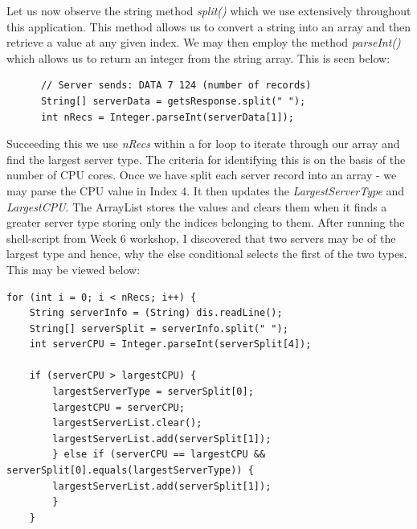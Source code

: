 \documentclass{article}
\begin{document}
Let us now observe the string method \emph{split()} which we use extensively throughout this application. This method allows us to convert a string into an array and then retrieve a value at any given index. We may then employ the method \emph{parseInt()} which allows us to return an integer from the string array. This is seen below:

\begin{lstlisting}
      // Server sends: DATA 7 124 (number of records)
      String[] serverData = getsResponse.split(" ");
      int nRecs = Integer.parseInt(serverData[1]);
\end{lstlisting}

Succeeding this we use \emph{nRecs} within a for loop to iterate through our array and find the largest server type. The criteria for identifying this is on the basis of the number of CPU cores. Once we have split each server record into an array - we may parse the CPU value in Index 4. It then updates the \emph{LargestServerType} and \emph{LargestCPU}. The ArrayList stores the values and clears them when it finds a greater server type storing only the indices belonging to them. After running the shell-script from Week 6 workshop, I discovered that two servers may be of the largest type and hence, why the else conditional selects the first of the two types. This may be viewed below:

\begin{lstlisting}
for (int i = 0; i < nRecs; i++) {
    String serverInfo = (String) dis.readLine();
    String[] serverSplit = serverInfo.split(" ");
    int serverCPU = Integer.parseInt(serverSplit[4]);
    
    if (serverCPU > largestCPU) {
        largestServerType = serverSplit[0];
        largestCPU = serverCPU;
        largestServerList.clear();
        largestServerList.add(serverSplit[1]);
        } else if (serverCPU == largestCPU && serverSplit[0].equals(largestServerType)) {
        largestServerList.add(serverSplit[1]);
        }
    }
\end{lstlisting}
\end{document}

